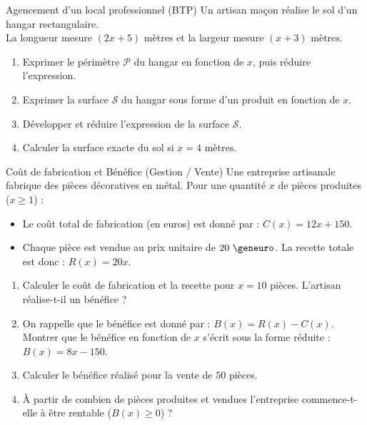 \begin{exercice}[4 pts]{\capAnalyser}{Agencement d'un local professionnel (BTP)}
Un artisan maçon réalise le sol d'un hangar rectangulaire.\\
La longueur mesure $(2x + 5)\text{ mètres}$ et la largeur mesure $(x + 3)\text{ mètres}$.

\begin{center}
\end{center}

\begin{enumerate}
    \item Exprimer le périmètre $\mathcal{P}$ du hangar en fonction de $x$, puis réduire l'expression.
    \item Exprimer la surface $\mathcal{S}$ du hangar sous forme d'un produit en fonction de $x$.
    \item Développer et réduire l'expression de la surface $\mathcal{S}$.
    \item Calculer la surface exacte du sol si $x = 4\text{ mètres}$.
\end{enumerate}
\lignesreponse[6]
\end{exercice}

\begin{exercice}[5 pts]{\capAnalyser}{Coût de fabrication et Bénéfice (Gestion / Vente)}
Une entreprise artisanale fabrique des pièces décoratives en métal.
Pour une quantité $x$ de pièces produites ($x \geq 1$) :
\begin{itemize}
    \item Le coût total de fabrication (en euros) est donné par : $C(x) = 12x + 150$.
    \item Chaque pièce est vendue au prix unitaire de $20\text{ \euro{}}$. La recette totale est donc : $R(x) = 20x$.
\end{itemize}

\begin{enumerate}
    \item Calculer le coût de fabrication et la recette pour $x = 10$ pièces. L'artisan réalise-t-il un bénéfice ?
    \item On rappelle que le bénéfice est donné par : $B(x) = R(x) - C(x)$.\\
    Montrer que le bénéfice en fonction de $x$ s'écrit sous la forme réduite : $B(x) = 8x - 150$.
    \item Calculer le bénéfice réalisé pour la vente de $50$ pièces.
    \item À partir de combien de pièces produites et vendues l'entreprise commence-t-elle à être rentable ($B(x) \geq 0$) ?
\end{enumerate}
\lignesreponse[6]
\end{exercice}

